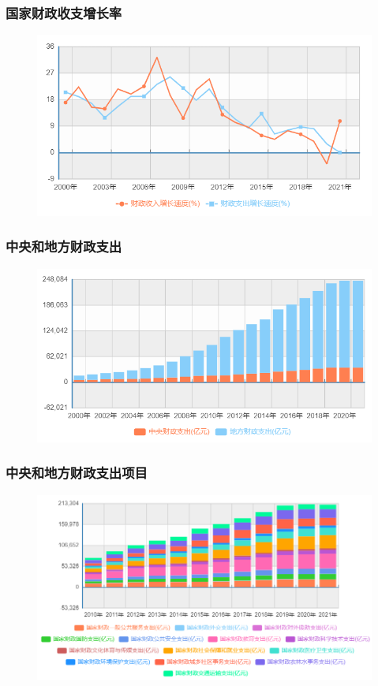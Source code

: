 \documentclass[aspectratio=169, 12pt]{beamer}
\begin{document}
\begin{frame}[plain]
    \frametitle{国家财政收支增长率}
    \begin{figure}
        \centering
        \includegraphics[width=1.0\textwidth]{./resources/figure/finrate.png}
    \end{figure}
\end{frame}

\begin{frame}[plain]
    \frametitle{中央和地方财政支出}
    \begin{figure}
        \centering
        \includegraphics[width=1.0\textwidth]{./resources/figure/spend.png}
    \end{figure}
\end{frame}

\begin{frame}[plain]
    \frametitle{中央和地方财政支出项目}
    \begin{figure}
        \centering
        \includegraphics[width=1.0\textwidth]{./resources/figure/spendratio.png}
    \end{figure}
\end{frame}
\end{document}
